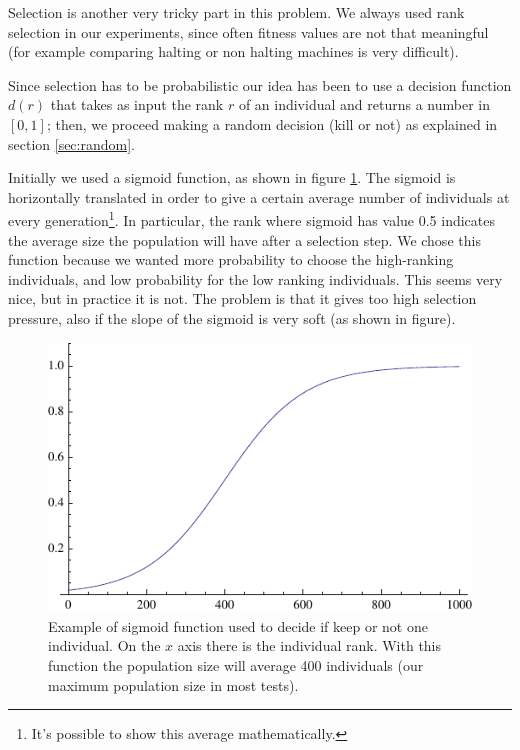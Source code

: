 \documentclass{report}
\begin{document}
Selection is another very tricky part in this problem. We always used rank selection in our experiments, since often fitness values are not that meaningful (for example comparing halting or non halting machines is very difficult).

Since selection has to be probabilistic our idea has been to use a decision function $d(r)$ that takes as input the rank $r$ of an individual and returns a number in $[0,1]$; then, we proceed making a random decision (kill or not) as explained in section \ref{sec:random}.

Initially we used a sigmoid function, as shown in figure \ref{fig:sigmoid}. The sigmoid is horizontally translated in order to give a certain average number of individuals at every generation\footnote{It's possible to show this average mathematically.}. In particular, the rank where sigmoid has value 0.5 indicates the average size the population will have after a selection step. We chose this function because we wanted more probability to choose the high-ranking individuals, and low probability for the low ranking individuals.
This seems very nice, but in practice it is not. The problem is that it gives too high selection pressure, also if the slope of the sigmoid is very soft (as shown in figure).

\begin{figure}[t]\centering
\includegraphics{figures/decision-function.pdf}
\caption{Example of sigmoid function used to decide if keep or not one individual. On the $x$ axis there is the individual rank. With this function the population size will average 400 individuals (our maximum population size in most tests).}
\label{fig:sigmoid}
\end{figure}
\end{document}
